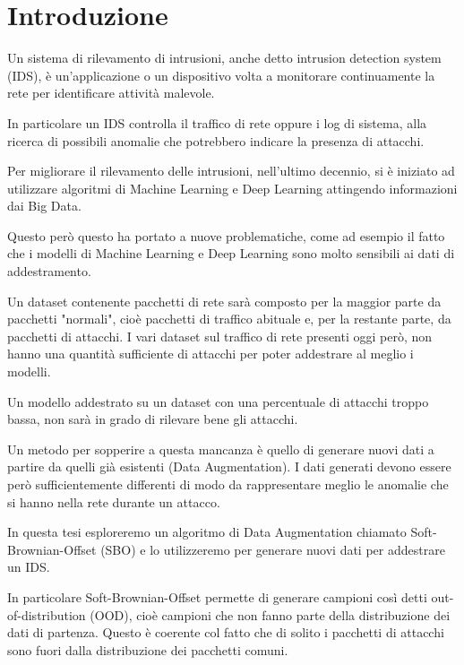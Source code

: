 \chapter{Introduzione}

Un sistema di rilevamento di intrusioni, anche detto intrusion detection system (IDS),  è un'applicazione o un dispositivo volta a monitorare continuamente la rete per identificare attività malevole. 

In particolare un IDS controlla il traffico di rete oppure i log di sistema, alla ricerca di possibili anomalie che potrebbero indicare la presenza di attacchi.

Per migliorare il rilevamento delle intrusioni, nell'ultimo decennio, si è iniziato ad utilizzare algoritmi di Machine Learning e Deep Learning attingendo informazioni dai Big Data. \cite{ids_ml}

Questo però questo ha portato a nuove problematiche, come ad esempio il fatto che i modelli di Machine Learning e Deep Learning sono molto sensibili ai dati di addestramento.


Un dataset contenente pacchetti di rete sarà composto per la maggior parte da pacchetti "normali", cioè pacchetti di traffico abituale e, per la restante parte, da pacchetti di attacchi. 
I vari dataset sul traffico di rete presenti oggi però, non hanno una quantità sufficiente di attacchi per poter addestrare al meglio i modelli. 

Un modello addestrato su un dataset con una percentuale di attacchi troppo bassa, non sarà in grado di rilevare bene gli attacchi.

Un metodo per sopperire a questa mancanza è quello di generare nuovi dati a partire da quelli già esistenti (Data Augmentation). I dati generati devono essere però sufficientemente differenti di modo da rappresentare meglio le anomalie che si hanno nella rete durante un attacco.


In questa tesi esploreremo un algoritmo di Data Augmentation chiamato Soft-Brownian-Offset (SBO) \cite{sbo} e lo utilizzeremo per generare nuovi dati per addestrare un IDS.

In particolare Soft-Brownian-Offset permette di generare campioni così detti out-of-distribution (OOD), cioè campioni che non fanno parte della distribuzione dei dati di partenza. Questo è coerente col fatto che di solito i pacchetti di attacchi sono fuori dalla distribuzione dei pacchetti comuni.


